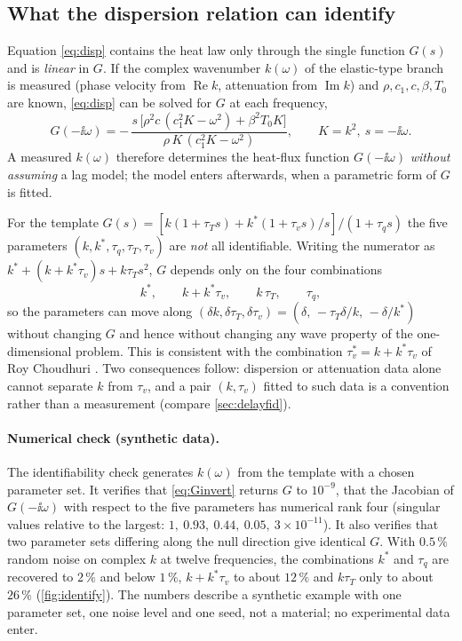 \subsection{What the dispersion relation can identify}\label{sec:identify}
Equation \eqref{eq:disp} contains the heat law only through the single function $G(s)$ and is \emph{linear} in $G$. If the complex wavenumber $k(\omega)$ of the elastic-type branch is measured (phase velocity from $\operatorname{Re}k$, attenuation from $\operatorname{Im}k$) and $\rho,c_1,c,\beta,T_0$ are known, \eqref{eq:disp} can be solved for $G$ at each frequency,
\begin{equation}
G(-\ii\omega)=-\,\frac{s\,\bigl[\rho^2c\,(c_1^2K-\omega^2)+\beta^2T_0K\bigr]}{\rho\,K\,(c_1^2K-\omega^2)},\qquad K=k^2,\ s=-\ii\omega .\label{eq:Ginvert}
\end{equation}
A measured $k(\omega)$ therefore determines the heat-flux function $G(-\ii\omega)$ \emph{without assuming} a lag model; the model enters afterwards, when a parametric form of $G$ is fitted.

For the template $G(s)=[k(1+\tau_Ts)+k^*(1+\tau_vs)/s]/(1+\tau_qs)$ the five parameters $(k,k^*,\tau_q,\tau_T,\tau_v)$ are \emph{not} all identifiable. Writing the numerator as $k^*+(k+k^*\tau_v)s+k\tau_Ts^2$, $G$ depends only on the four combinations
\begin{equation}
k^*,\qquad k+k^*\tau_v,\qquad k\,\tau_T,\qquad \tau_q ,
\end{equation}
so the parameters can move along $(\delta k,\delta\tau_T,\delta\tau_v)=(\delta,\,-\tau_T\delta/k,\,-\delta/k^*)$ without changing $G$ and hence without changing any wave property of the one-dimensional problem. This is consistent with the combination $\tau_v^{*}=k+k^*\tau_v$ of Roy Choudhuri \citep{RoyChoudhuri2007}. Two consequences follow: dispersion or attenuation data alone cannot separate $k$ from $\tau_v$, and a pair $(k,\tau_v)$ fitted to such data is a convention rather than a measurement (compare \cref{sec:delayfid}).

\paragraph{Numerical check (synthetic data).} The identifiability check generates $k(\omega)$ from the template with a chosen parameter set. It verifies that \eqref{eq:Ginvert} returns $G$ to $10^{-9}$, that the Jacobian of $G(-\ii\omega)$ with respect to the five parameters has numerical rank four (singular values relative to the largest: $1,\ 0.93,\ 0.44,\ 0.05,\ 3\times10^{-11}$). It also verifies that two parameter sets differing along the null direction give identical $G$. With $0.5\,\%$ random noise on complex $k$ at twelve frequencies, the combinations $k^*$ and $\tau_q$ are recovered to $2\,\%$ and below $1\,\%$, $k+k^*\tau_v$ to about $12\,\%$ and $k\tau_T$ only to about $26\,\%$ (\cref{fig:identify}). The numbers describe a synthetic example with one parameter set, one noise level and one seed, not a material; no experimental data enter.

